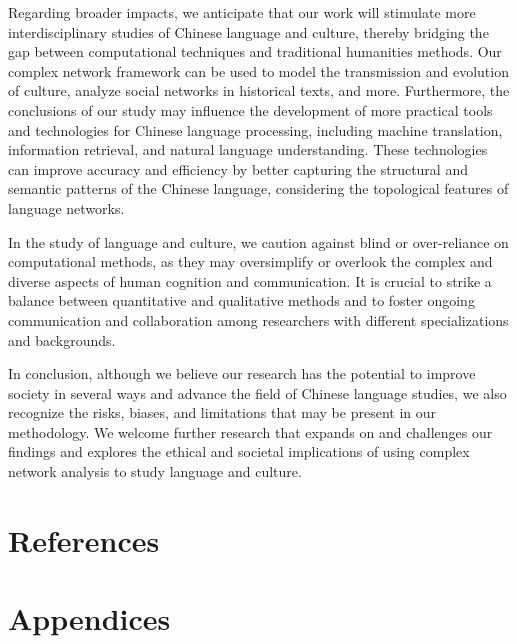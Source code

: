 \documentclass[11pt]{article}
\begin{document}
Regarding broader impacts, we anticipate that our work will stimulate more interdisciplinary studies of Chinese language and culture, thereby bridging the gap between computational techniques and traditional humanities methods. Our complex network framework can be used to model the transmission and evolution of culture, analyze social networks in historical texts, and more. Furthermore, the conclusions of our study may influence the development of more practical tools and technologies for Chinese language processing, including machine translation, information retrieval, and natural language understanding. These technologies can improve accuracy and efficiency by better capturing the structural and semantic patterns of the Chinese language, considering the topological features of language networks.

In the study of language and culture, we caution against blind or over-reliance on computational methods, as they may oversimplify or overlook the complex and diverse aspects of human cognition and communication. It is crucial to strike a balance between quantitative and qualitative methods and to foster ongoing communication and collaboration among researchers with different specializations and backgrounds.

In conclusion, although we believe our research has the potential to improve society in several ways and advance the field of Chinese language studies, we also recognize the risks, biases, and limitations that may be present in our methodology. We welcome further research that expands on and challenges our findings and explores the ethical and societal implications of using complex network analysis to study language and culture.
\section*{References}

\appendix
\section*{Appendices}



% 
\end{document}
